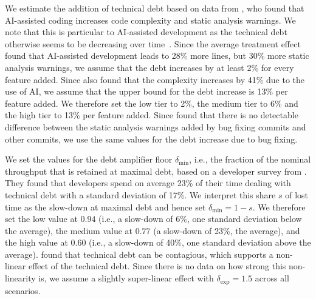 \documentclass[smallextended]{svjour3}       %
\begin{document}
We estimate the addition of technical debt based on data from \cite{he2026cursordebt}, who found that AI-assisted coding increases code complexity and static analysis warnings. We note that this is particular to AI-assisted development as the technical debt otherwise seems to be decreasing over time~\citep{trautsch2020longitudinal}. Since the average treatment effect found that AI-assisted development leads to 28\% more lines, but 30\% more static analysis warnings, we assume that the debt increases by at least 2\% for every feature added. Since \cite{he2026cursordebt} also found that the complexity increases by 41\% due to the use of AI, we assume that the upper bound for the debt increase is 13\% per feature added. We therefore set the low tier to 2\%, the medium tier to 6\% and the high tier to 13\% per feature added. Since \cite{trautsch2023automated} found that there is no detectable difference between the static analysis warnings added by bug fixing commits and other commits, we use the same values for the debt increase due to bug fixing. 

We set the values for the debt amplifier floor $\delta_\mathrm{min}$, i.e., the fraction of the nominal throughput that is retained at maximal debt, based on a developer survey from \cite{besker2018technical}. They found that developers spend on average 23\% of their time dealing with technical debt with a standard deviation of 17\%. We interpret this share $s$ of lost time as the slow-down at maximal debt and hence set $\delta_\mathrm{min} = 1 - s$. We therefore set the low value at $0.94$ (i.e., a slow-down of 6\%, one standard deviation below the average), the medium value at $0.77$ (a slow-down of 23\%, the average), and the high value at $0.60$ (i.e., a slow-down of 40\%, one standard deviation above the average). \cite{martini2017interest} found that technical debt can be contagious, which supports a non-linear effect of the technical debt. Since there is no data on how strong this non-linearity is, we assume a slightly super-linear effect with $\delta_\mathrm{exp} = 1.5$ across all scenarios.
\end{document}

